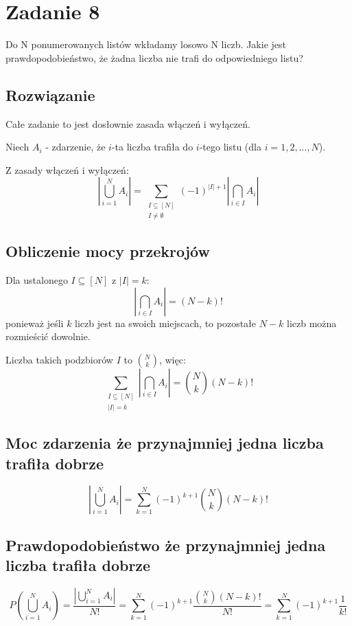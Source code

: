 


\section{Zadanie 8}
Do N ponumerowanych listów wkładamy losowo N liczb. Jakie jest prawdopodobieństwo, że żadna liczba nie trafi do odpowiedniego listu?

\subsection*{Rozwiązanie}
Całe zadanie to jest dosłownie zasada włączeń i wyłączeń.

Niech \(A_i\) - zdarzenie, że \(i\)-ta liczba trafiła do \(i\)-tego listu (dla \(i = 1, 2, \ldots, N\)).

Z zasady włączeń i wyłączeń:
\[
	\left| \bigcup_{i=1}^N A_i \right| = \sum_{\substack{I \subseteq [N] \\ I \neq \emptyset}} (-1)^{|I| + 1} \left| \bigcap_{i \in I} A_i \right|
\]

\subsection*{Obliczenie mocy przekrojów}

Dla ustalonego \(I \subseteq [N]\) z \(|I| = k\):
\[
	\left| \bigcap_{i \in I} A_i \right| = (N-k)!
\]
ponieważ jeśli \(k\) liczb jest na swoich miejscach, to pozostałe \(N-k\) liczb można rozmieścić dowolnie.

Liczba takich podzbiorów \(I\) to \(\binom{N}{k}\), więc:
\[
	\sum_{\substack{I \subseteq [N] \\ |I| = k}} \left| \bigcap_{i \in I} A_i \right| = \binom{N}{k} (N-k)!
\]

\subsection*{Moc zdarzenia że przynajmniej jedna liczba trafiła dobrze}

\[
	\left| \bigcup_{i=1}^N A_i \right| = \sum_{k=1}^N (-1)^{k+1} \binom{N}{k} (N-k)!
\]

\subsection*{Prawdopodobieństwo że przynajmniej jedna liczba trafiła dobrze}

\[
	P\left( \bigcup_{i=1}^N A_i \right) = \frac{\left| \bigcup_{i=1}^N A_i \right|}{N!}
	= \sum_{k=1}^N (-1)^{k+1} \frac{ \binom{N}{k} (N-k)!}{N!}
	= \sum_{k=1}^N (-1)^{k+1} \frac{1}{k!}
\]

